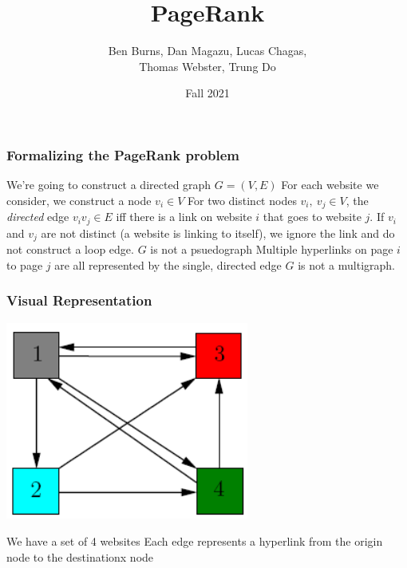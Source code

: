 \documentclass{beamer}
\title{PageRank}
\author{Ben Burns, Dan Magazu, Lucas Chagas, \\Thomas Webster, Trung Do}
\institute{MATH 455}
\date{Fall 2021}
\begin{document}
\frame{\titlepage}

\begin{frame}[t]
\frametitle{Formalizing the PageRank problem}
\begin{outline}
    \1 We're going to construct a directed graph $G = (V, E)$
    \1 For each website we consider, we construct a node $v_i \in V$
    \1 For two distinct nodes $v_i,\ v_j \in V$, the \emph{directed} edge $v_iv_j \in E$ iff there is a link on website $i$ that goes to website $j$.
    \1 If $v_i$ and $v_j$ are not distinct (a website is linking to itself), we ignore the link and do not construct a loop edge.
        \2 $G$ is not a psuedograph
    \1 Multiple hyperlinks on page $i$ to page $j$ are all represented by the single, directed edge 
        \2 $G$ is not a multigraph.
\end{outline}
\end{frame}

\begin{frame}
\frametitle{Visual Representation}
\begin{center}
    \includegraphics[width=0.6\textwidth]{unweighted.png}
\end{center}
\begin{outline}
    \1 We have a set of 4 websites
    \1 Each edge represents a hyperlink from the origin node to the destinationx node 
\end{outline}
\end{frame}
\end{document}
